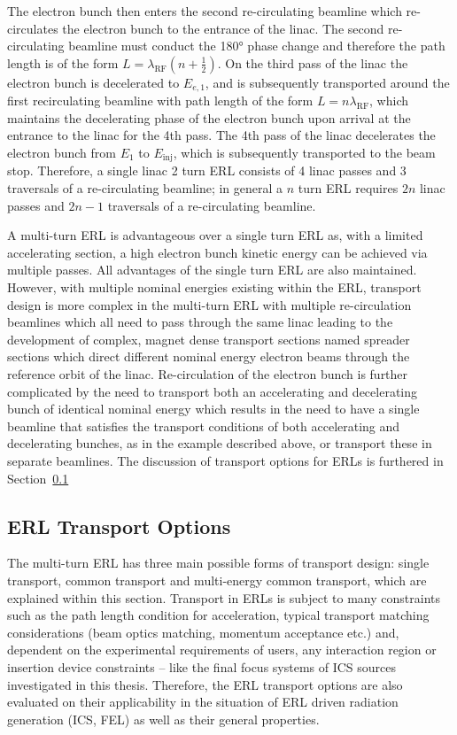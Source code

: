 \documentclass[../main.tex]{subfiles}
\begin{document}
The electron bunch then enters the second re-circulating beamline which re-circulates the electron bunch to the entrance of the linac. The second re-circulating beamline must conduct the 180\si{\degree} phase change and therefore the path length is of the form $L=\lambda_{\mathrm{RF}}\left(n+\frac{1}{2}\right)$. On the third pass of the linac the electron bunch is decelerated to $E_{e,1}$, and is subsequently transported around the first recirculating beamline with path length of the form $L=n\lambda_{\mathrm{RF}}$, which maintains the decelerating phase of the electron bunch upon arrival at the entrance to the linac for the 4th pass. The 4th pass of the linac decelerates the electron bunch from $E_{1}$ to $E_{\mathrm{inj}}$, which is subsequently transported to the beam stop. Therefore, a single linac 2 turn ERL consists of 4 linac passes and 3 traversals of a re-circulating beamline; in general a $n$ turn ERL requires $2n$ linac passes and $2n-1$ traversals of a re-circulating beamline.

A multi-turn ERL is advantageous over a single turn ERL as, with a limited accelerating section, a high electron bunch kinetic energy can be achieved via multiple passes. All advantages of the single turn ERL are also maintained. However, with multiple nominal energies existing within the ERL, transport design is more complex in the multi-turn ERL with multiple re-circulation beamlines which all need to pass through the same linac leading to the development of complex, magnet dense transport sections named spreader sections which direct different nominal energy electron beams through the reference orbit of the linac. Re-circulation of the electron bunch is further complicated by the need to transport both an accelerating and decelerating bunch of identical nominal energy which results in the need to have a single beamline that satisfies the transport conditions of both accelerating and decelerating bunches, as in the example described above, or transport these in separate beamlines. The discussion of transport options for ERLs is furthered in Section~\ref{sec:ERL_transport_options} 

\subsection{ERL Transport Options}
\label{sec:ERL_transport_options}

The multi-turn ERL has three main possible forms of transport design: single transport, common transport and multi-energy common transport, which are explained within this section. Transport in ERLs is subject to many constraints such as the path length condition for acceleration, typical transport matching considerations (beam optics matching, momentum acceptance etc.) and, dependent on the experimental requirements of users, any interaction region or insertion device constraints -- like the final focus systems of ICS sources investigated in this thesis. Therefore, the ERL transport options are also evaluated on their applicability in the situation of ERL driven radiation generation (ICS, FEL) as well as their general properties.
\end{document}

